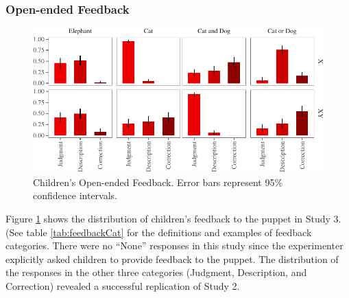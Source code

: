 \documentclass[oneside]{report}
\theoremstyle{definition}
\theoremstyle{definition}
\theoremstyle{definition}
\theoremstyle{remark}
\begin{document}
\subsubsection{Open-ended Feedback}\label{open-ended-feedback}
\begin{figure}[h]

{\centering \includegraphics{figs/feedbackStudy3-1} 

}

\caption{Children's Open-ended Feedback. Error bars represent 95\% confidence intervals.}\label{fig:feedbackStudy3}
\end{figure}
Figure \ref{fig:feedbackStudy3} shows the distribution of children's
feedback to the puppet in Study 3. (See table \ref{tab:feedbackCat} for
the definitions and examples of feedback categories. There were no
``None'' responses in this study since the experimenter explicitly asked
children to provide feedback to the puppet. The distribution of the
responses in the other three categories (Judgment, Description, and
Correction) revealed a successful replication of Study 2.
\end{document}

